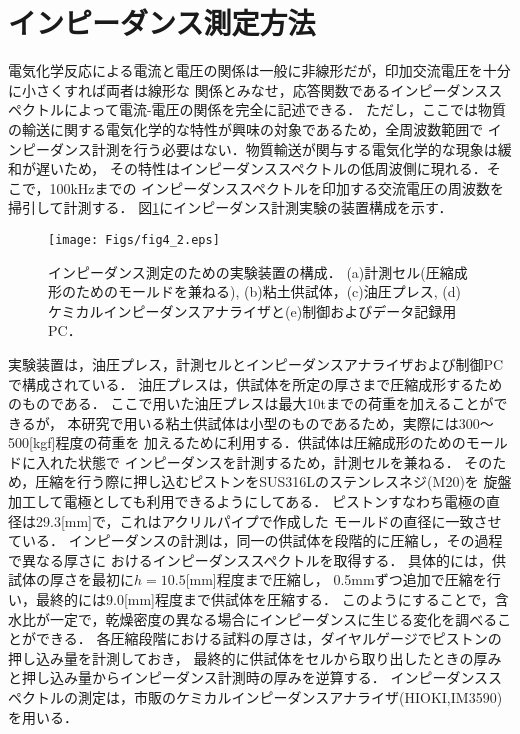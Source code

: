 \section{インピーダンス測定方法}
電気化学反応による電流と電圧の関係は一般に非線形だが，印加交流電圧を十分に小さくすれば両者は線形な
関係とみなせ，応答関数であるインピーダンススペクトルによって電流-電圧の関係を完全に記述できる．
ただし，ここでは物質の輸送に関する電気化学的な特性が興味の対象であるため，全周波数範囲で
インピーダンス計測を行う必要はない．物質輸送が関与する電気化学的な現象は緩和が遅いため，
その特性はインピーダンススペクトルの低周波側に現れる．そこで，100kHzまでの
インピーダンススペクトルを印加する交流電圧の周波数を掃引して計測する．
図\ref{fig:fig4_2}にインピーダンス計測実験の装置構成を示す．
\begin{figure}[h]
	\begin{center}
	\texttt{[image: Figs/fig4\_2.eps]} 
	\end{center}
	\caption{
		インピーダンス測定のための実験装置の構成．
		(a)計測セル(圧縮成形のためのモールドを兼ねる), (b)粘土供試体，(c)油圧プレス, 
		(d)ケミカルインピーダンスアナライザと(e)制御およびデータ記録用PC．
	} 
	\label{fig:fig4_2}
\end{figure}
実験装置は，油圧プレス，計測セルとインピーダンスアナライザおよび制御PCで構成されている．
油圧プレスは，供試体を所定の厚さまで圧縮成形するためのものである．
ここで用いた油圧プレスは最大10tまでの荷重を加えることができるが，
本研究で用いる粘土供試体は小型のものであるため，実際には300〜500[kgf]程度の荷重を
加えるために利用する．供試体は圧縮成形のためのモールドに入れた状態で
インピーダンスを計測するため，計測セルを兼ねる．
そのため，圧縮を行う際に押し込むピストンをSUS316Lのステンレスネジ(M20)を
旋盤加工して電極としても利用できるようにしてある．
ピストンすなわち電極の直径は29.3[mm]で，これはアクリルパイプで作成した
モールドの直径に一致させている．
インピーダンスの計測は，同一の供試体を段階的に圧縮し，その過程で異なる厚さに
おけるインピーダンススペクトルを取得する．
具体的には，供試体の厚さを最初に$h=10.5$[mm]程度まで圧縮し，
0.5mmずつ追加で圧縮を行い，最終的には9.0[mm]程度まで供試体を圧縮する．
このようにすることで，含水比が一定で，乾燥密度の異なる場合にインピーダンスに生じる変化を調べることができる．
各圧縮段階における試料の厚さは，ダイヤルゲージでピストンの押し込み量を計測しておき，
最終的に供試体をセルから取り出したときの厚みと押し込み量からインピーダンス計測時の厚みを逆算する．
インピーダンススペクトルの測定は，市販のケミカルインピーダンスアナライザ(HIOKI,IM3590)を用いる．
